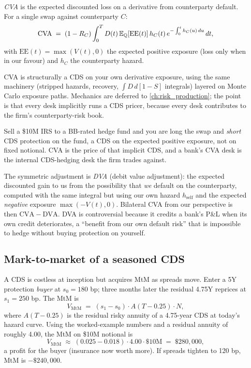 \begin{definition}
\emph{CVA} is the expected discounted loss on a derivative from
counterparty default.  For a single swap against counterparty $C$:
\[
  \mathrm{CVA}
  \;=\; (1 - R_C) \int_0^T D(t)\, \mathbb{E}_{\mathbb{Q}}[\mathrm{EE}(t)]\, h_C(t)\, e^{-\int_0^t h_C(u)\, du}\, dt,
\]
with $\mathrm{EE}(t) = \max(V(t), 0)$ the expected positive exposure
(loss only when in our favour) and $h_C$ the counterparty hazard.
\end{definition}

CVA is structurally a CDS on your own derivative exposure, using
the same machinery (stripped hazards, recovery, $\int D\,d[1-S]$
integrals) layered on Monte Carlo exposure paths.  Mechanics are
deferred to \cref{ch:risk_production}; the point is that every desk
implicitly runs a CDS pricer, because every desk contributes to the
firm's counterparty-risk book.

\begin{intuitionbox}
Sell a \$10M IRS to a BB-rated hedge fund and you are long the
swap and \emph{short} CDS protection on the fund, a CDS on the
expected positive exposure, not on fixed notional.  CVA is the
price of that implicit CDS, and a bank's CVA desk is the internal
CDS-hedging desk the firm trades against.
\end{intuitionbox}

The symmetric adjustment is \emph{DVA} (debit value adjustment): the
expected discounted gain to us from the possibility that \emph{we}
default on the counterparty, computed with the same integral but
using our own hazard $h_{\mathrm{self}}$ and the expected
\emph{negative} exposure $\max(-V(t), 0)$.  Bilateral CVA from our
perspective is then $\mathrm{CVA} - \mathrm{DVA}$.  DVA is
controversial because it credits a bank's P\&L when its own credit
deteriorates, a ``benefit from our own default risk'' that is
impossible to hedge without buying protection on yourself.


\subsection{Mark-to-market of a seasoned CDS}
\label{sec:mtm_seasoned}

A CDS is costless at inception but acquires MtM as spreads move.
Enter a 5Y protection \emph{buyer} at $s_0 = 180$ bp; three months
later the residual 4.75Y reprices at $s_1 = 250$ bp.  The MtM is
\citeHull
\[
  V_{\mathrm{MtM}}
  \;=\; (s_1 - s_0) \cdot A(T - 0.25) \cdot N,
\]
where $A(T - 0.25)$ is the residual risky annuity of a 4.75-year
CDS at today's hazard curve.  Using the worked-example numbers and
a residual annuity of roughly 4.00, the MtM on \$10M notional is
\[
  V_{\mathrm{MtM}}
  \;\approx\; (0.025 - 0.018) \cdot 4.00 \cdot \$10\mathrm{M}
  \;=\; \$280{,}000,
\]
a profit for the buyer (insurance now worth more).  If spreads
tighten to 120 bp, MtM is $-\$240{,}000$.

